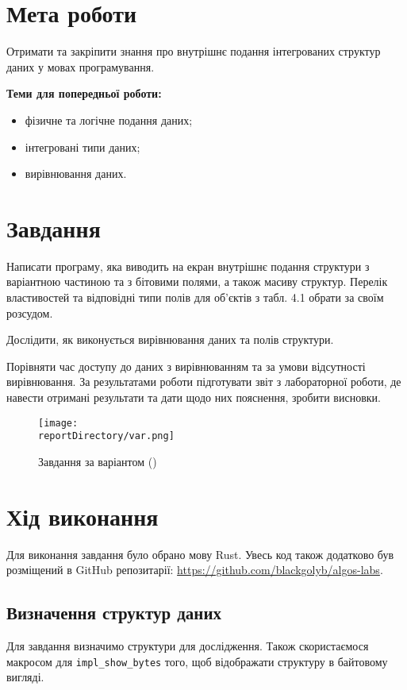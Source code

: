 \section{Мета роботи}
Отримати та закріпити знання про внутрішнє подання
інтегрованих структур даних у мовах програмування.

\noindent
\textbf{Теми для попередньої роботи:}
\begin{itemize}
    \item фізичне та логічне подання даних;
    \item інтегровані типи даних;
    \item вирівнювання даних.
\end{itemize}


\section{Завдання}
Написати програму, яка виводить на екран внутрішнє подання структури з варіантною частиною та з бітовими полями,
а також масиву структур. Перелік властивостей та відповідні типи полів для об’єктів з
табл. 4.1 обрати за своїм розсудом.

Дослідити, як виконується вирівнювання даних та полів структури.

Порівняти час доступу до даних з вирівнюванням та за умови відсутності вирівнювання.
За результатами роботи підготувати звіт з лабораторної роботи, де навести отримані результати та дати щодо них пояснення, зробити висновки.

\begin{figure}[h!]
    \centering
    \texttt{[image: \\reportDirectory/var.png]}
    \caption{Завдання за варіантом (\variant)}
    \label{fig:task}
\end{figure}


\section{Хід виконання}
Для виконання завдання було обрано мову Rust.
Увесь код також додатково був розміщений в GitHub репозитарії: \href{https://github.com/blackgolyb/algos-labs}{https://github.com/blackgolyb/algos-labs}.


\newpage
\subsection{Визначення структур даних}
Для завдання визначимо структури для дослідження.
Також скористаємося макросом для \verb|impl_show_bytes| того,
щоб відображати структуру в байтовому вигляді.

